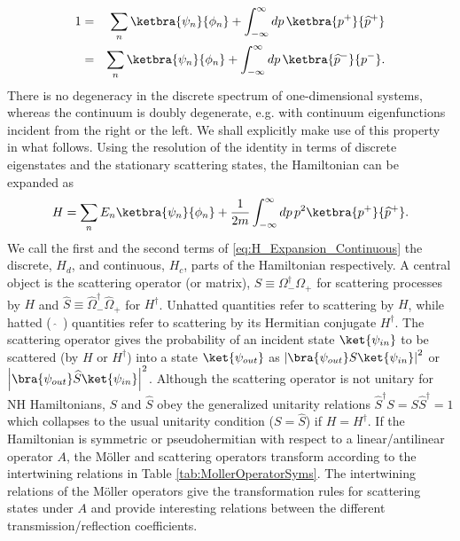 %
\begin{eqnarray}
    1 &=& \sum_{n}\ketbra{\psi_n}{\phi_n} + \int_{-\infty}^{\infty} dp\, \ketbra{p^+}{\widehat{p}^+}
    \nonumber\\
    &=& \sum_{n}\ketbra{\psi_n}{\phi_n} + \int_{-\infty}^{\infty} dp\, \ketbra{\widehat{p}^-}{p^-}.
    \label{eq:identity}
\end{eqnarray}
%
There is no degeneracy in the discrete spectrum of one-dimensional systems, whereas the continuum is doubly degenerate,
e.g. with continuum eigenfunctions incident from the right or the left.  We shall explicitly make use of this property in what follows. Using the resolution of the identity in terms of discrete eigenstates and the stationary scattering states, the Hamiltonian can be expanded as
%
\begin{equation}
    H = \sum_{n}E_n\ketbra{\psi_n}{\phi_n} + \frac{1}{2m}\int_{-\infty}^{\infty} dp\,p^2 \ketbra{p^+}{\widehat{p}^+}.
    \label{eq:H_Expansion_Continuous}
\end{equation}
%
We call the first and the second terms of \eqref{eq:H_Expansion_Continuous} the discrete, $H_d$, and continuous, $H_c$, parts of the Hamiltonian respectively. A central object is the scattering operator (or matrix), $S \equiv \Omega_-^\dagger \Omega_+$ for scattering processes by $H$ and $\widehat{S} \equiv \widehat{\Omega}_-^\dagger \widehat{\Omega}_+$ for $H^\dagger$. Unhatted quantities refer to scattering by $H$, while hatted ( $\widehat{\;}$ ) quantities refer to scattering by its Hermitian conjugate $H^\dagger$. The scattering operator gives the probability of an incident state $\ket{\psi_{in}}$ to be scattered (by $H$ or $H ^\dagger$) into a state $\ket{\psi_{out}}$ as $\left|\bra{\psi_{out}} S \ket{\psi_{in}}\right|^2$ or $\left|\bra{\psi_{out}} \widehat{S} \ket{\psi_{in}}\right|^2$. Although the scattering operator is not unitary for NH Hamiltonians, $S$ and $\widehat{S}$ obey the generalized unitarity relations $\widehat{S}^\dagger S = S\widehat{S}^\dagger= 1$ which collapses to the usual unitarity condition ($S = \widehat{S}$) if $H = H^\dagger$. If the Hamiltonian is symmetric or pseudohermitian with respect to a linear/antilinear operator $A$, the M\"oller and scattering operators transform according to the intertwining relations in Table \ref{tab:MollerOperatorSyms}. The intertwining relations of the M\"oller operators give the transformation rules for scattering states under $A$ and provide interesting relations between the different transmission/reflection coefficients.

